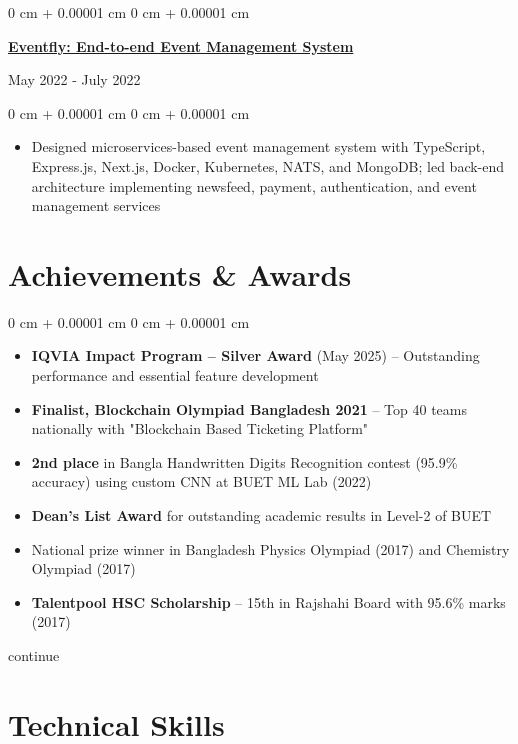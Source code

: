 \documentclass[10pt, letterpaper]{article}
\newenvironment{highlights}{
    \begin{itemize}[
        topsep=0.10 cm,
        parsep=0.10 cm,
        partopsep=0pt,
        itemsep=0pt,
        leftmargin=0 cm + 10pt
    ]
}{
    \end{itemize}
} %
\newenvironment{onecolentry}{
    \begin{adjustwidth}{
        0 cm + 0.00001 cm
    }{
        0 cm + 0.00001 cm
    }
}{
    \end{adjustwidth}
} %
\newenvironment{twocolentry}[2][]{
    \onecolentry
    \def\secondColumn{#2}
    \setcolumnwidth{\fill, 4.5 cm}
    \begin{paracol}{2}
}{
    \switchcolumn \raggedleft \secondColumn
    \end{paracol}
    \endonecolentry
} %
\begin{document}
\begin{twocolentry}{
            {May 2022 - July 2022}
        }
            \href{https://github.com/eventfly/Microservices}{\textbf{Eventfly: End-to-end Event Management System}}
        \end{twocolentry}
        
        
        \begin{onecolentry}
            \begin{highlights}
    \item Designed microservices-based event management system with TypeScript, Express.js, Next.js, Docker, Kubernetes, NATS, and MongoDB; led back-end architecture implementing newsfeed, payment, authentication, and event management services
\end{highlights}
        \end{onecolentry}

    \section{Achievements \& Awards}

        \begin{onecolentry}
            \begin{highlights}
                \item \textbf{IQVIA Impact Program – Silver Award} (May 2025) -- Outstanding performance and essential feature development
                \item \textbf{Finalist, Blockchain Olympiad Bangladesh 2021} -- Top 40 teams nationally with "Blockchain Based Ticketing Platform"
                \item \textbf{2nd place} in Bangla Handwritten Digits Recognition contest (95.9\% accuracy) using custom CNN at BUET ML Lab (2022)
                \item \textbf{Dean's List Award} for outstanding academic results in Level-2 of BUET
                \item National prize winner in Bangladesh Physics Olympiad (2017) and Chemistry Olympiad (2017)
                \item \textbf{Talentpool HSC Scholarship} -- 15th in Rajshahi Board with 95.6\% marks (2017)
            \end{highlights}continue
            
        \end{onecolentry}

         \section{Technical Skills}
\end{document}

